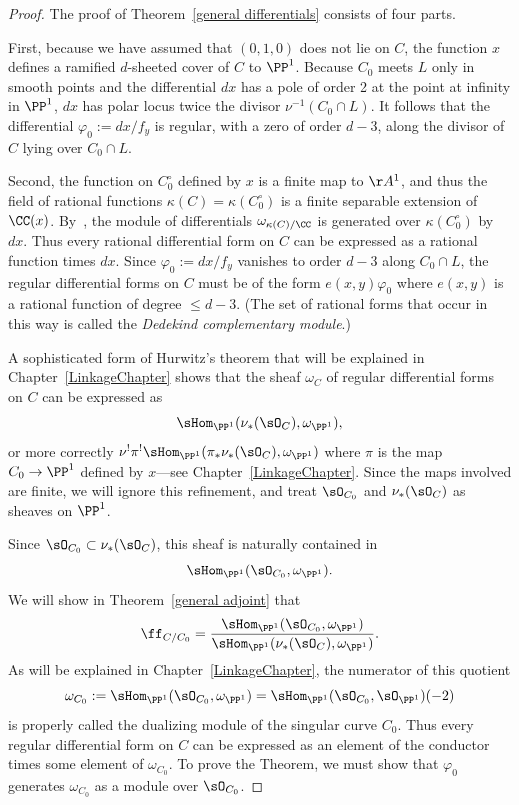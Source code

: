 \begin{proof}
The proof of Theorem~\ref{general differentials} consists of four parts. 

First, because we have assumed that $(0,1,0)$ does not lie on $C$, the function $x$ defines a
ramified $d$-sheeted cover of $C$ to $\PP^{1}$. Because $C_{0}$ meets $L$ only in smooth
points and the differential $dx$ has a pole of order 2 at the point at infinity in $\PP^{1}$,
$dx$
has polar locus twice the divisor $ \nu^{-1}(C_{0}\cap L)$. It follows that
the differential
$\varphi_0 := dx/f_{y}$ is regular, with a zero of order $d-3$,
along the divisor of $C$ lying over $C_0\cap L$.

Second, the function on $C^\circ_0$ defined by $x$  
is a finite map to $\AA^1$, and thus the field of rational functions $\kappa(C) = \kappa(C^\circ_0)$ is a finite
separable extension of $\CC(x)$. By~\cite[Section 16.5]{Eisenbud1995}, the module of differentials 
$\omega_{\kappa(C)/\CC}$ is generated over $\kappa(C^\circ_0)$ by $dx$. Thus every rational
differential form on $C$ can be expressed as a rational function
times $dx$. Since $\varphi_{0} := dx/f_{y}$ vanishes to order $d-3$ along $C_{0}\cap L$,
the regular differential forms on $C$ must be of the form $e(x,y)\varphi_{0}$ where
$e(x,y)$ is a rational function of degree $\leq d-3$. (The set of rational forms that occur in this
way is called the \emph{Dedekind complementary module}.)
 
A sophisticated form of Hurwitz's theorem that will be explained in Chapter~\ref{LinkageChapter}
shows that the sheaf $\omega_{C}$ of regular differential forms on $C$ can be expressed as
$$
\sHom_{\PP^{1}}(\nu_{*}(\sO_{C}), \omega_{\PP^{1}}),
$$
or more correctly $\nu^{!}\pi^{!}\sHom_{\PP^{1}}(\pi_{*}\nu_{*}(\sO_{C}), \omega_{\PP^{1}})$
where $\pi$ is the map $C_{0}\to \PP^{1}$ defined by $x$---see Chapter~\ref{LinkageChapter}. Since the maps involved are finite,
we will ignore this refinement, and treat $\sO_{C_{0}}$ and $\nu_{*}(\sO_{C})$ as sheaves on $\PP^{1}$.

Since $\sO_{C_{0}}\subset \nu_{*}(\sO_{C})$, this sheaf is naturally contained
in 
$$
\sHom_{\PP^{1}}(\sO_{C_{0}}, \omega_{\PP^{1}}).
$$
We will show in Theorem~\ref{general adjoint} that 
$$
\ff_{C/C_{0}} = 
\frac{\sHom_{\PP^{1}}(\sO_{C_{0}}, \omega_{\PP^{1}})}
{\sHom_{\PP^{1}}(\nu_{*}(\sO_{C}), \omega_{\PP^{1}})}.
$$
As will be explained in Chapter~\ref{LinkageChapter}, the numerator of this quotient
$$
\omega_{C_{0}}:= \sHom_{\PP^{1}}(\sO_{C_{0}}, \omega_{\PP^{1}}) = 
\sHom_{\PP^{1}}(\sO_{C_{0}}, \sO_{\PP^{1}})(-2)
$$
 is properly called the dualizing module  of the singular curve $C_{0}$.
Thus every regular differential form on $C$ can be expressed as an element of the conductor
times some element of $\omega_{C_{0}}$. To prove the Theorem, we must show that
$\varphi_{0}$ generates $\omega_{C_{0}}$ as a module over $\sO_{C_{0}}$.


\end{proof}
